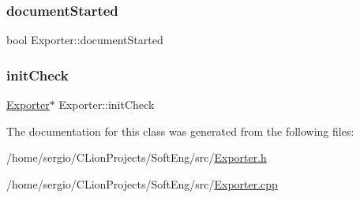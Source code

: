 \subsubsection{\texorpdfstring{document\+Started}{documentStarted}}
{\footnotesize\ttfamily bool Exporter\+::document\+Started\hspace{0.3cm}{\ttfamily [protected]}}

\mbox{\label{class_exporter_a74245e988d8e72a43704dda927acff05}} 
\subsubsection{\texorpdfstring{init\+Check}{initCheck}}
{\footnotesize\ttfamily \hyperlink{class_exporter}{Exporter}$\ast$ Exporter\+::init\+Check\hspace{0.3cm}{\ttfamily [protected]}}



The documentation for this class was generated from the following files\+:\begin{DoxyCompactItemize}
\item 
/home/sergio/\+C\+Lion\+Projects/\+Soft\+Eng/src/\hyperlink{_exporter_8h}{Exporter.\+h}\item 
/home/sergio/\+C\+Lion\+Projects/\+Soft\+Eng/src/\hyperlink{_exporter_8cpp}{Exporter.\+cpp}\end{DoxyCompactItemize}

